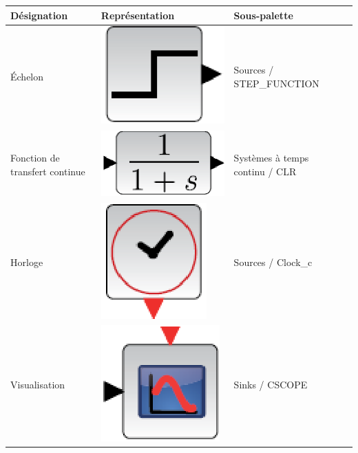 \begin{table}[h]
    \centering
\begin{tabular}{|M{4cm}|M{6cm}|M{4cm}|N}
    \hline
    Désignation   & Représentation & Sous-palette & \\
    \hline
    \'Echelon     & \begin{minipage}{6cm}\centering \includegraphics[width=0.25\linewidth]{fig/scilab05.eps}\end{minipage} & Sources / STEP\_FUNCTION & \\[2.75em]
    \hline
    Fonction de transfert continue     & \begin{minipage}{6cm}\centering \includegraphics[width=0.25\linewidth]{fig/scilab06.eps}\end{minipage} & Systèmes à temps continu / CLR & \\[3em]
    \hline
    Horloge       & \begin{minipage}{6cm}\centering \includegraphics[width=0.2\linewidth]{fig/scilab07.eps}\end{minipage} & Sources / Clock\_c & \\[2.75em]
    \hline
    Visualisation & \begin{minipage}{6cm}\centering \includegraphics[width=0.25\linewidth]{fig/scilab08.eps}\end{minipage} & Sinks / CSCOPE& \\[2.75em]
    \hline
\end{tabular}
\end{table}

